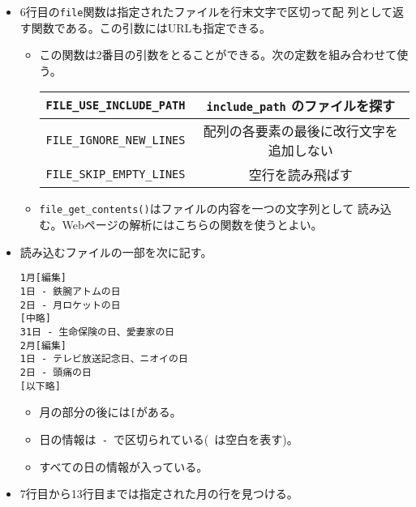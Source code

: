 \begin{Exec}
\begin{itemize}
\begin{itemize}
       きるように、スーパーグローバル\Verb+$_GET+内に値があれば
       (\Verb+isset()+)が\Verb+true+になれば、その値を、そうでなければコ
       マンドからの引数を設定している。
 \item スーパーグローバル\Verb+$argv+はの先頭は呼び出したファイル名であ
       り、その後に引数が順に入る\footnote{C言語の\texttt{main}関数は通
       常、\texttt{int main(int argc, char* argv[])}と宣言される。%
       \texttt{argc}は\texttt{argv}の配列の大きさを表し、渡された引数の
       リストが\texttt{argv[]}に入っている。このとき、\texttt{argv[0]}は実行
       したときのファイル名が入る。}。
\end{itemize}
 \item 6行目の\texttt{file}関数は指定されたファイルを行末文字で区切って配
       列として返す関数である。この引数にはURLも指定できる。
\begin{itemize}
 \item この関数は2番目の引数をとることができる。次の定数を組み合わせて使
       う。
\begin{center}
 \begin{tabular}{|c|c|}\hline
 \Verb+FILE_USE_INCLUDE_PATH+ & \Verb+include_path+ のファイルを探す\\\hline
 \Verb+FILE_IGNORE_NEW_LINES+ & 配列の各要素の最後に改行文字を追加しない
      \\ \hline
  \Verb+FILE_SKIP_EMPTY_LINES+&空行を読み飛ばす \\ \hline
 \end{tabular}
\end{center}
 \item \Verb+file_get_contents()+はファイルの内容を一つの文字列として
       読み込む。Webページの解析にはこちらの関数を使うとよい。
\end{itemize}
 \item 読み込むファイルの一部を次に記す。
\begin{Verbatim}
1月[編集]
1日 - 鉄腕アトムの日
2日 - 月ロケットの日
[中略]
31日 - 生命保険の日、愛妻家の日
2月[編集]
1日 - テレビ放送記念日、ニオイの日
2日 - 頭痛の日
[以下略]
\end{Verbatim}
\begin{itemize}
 \item 月の部分の後には\texttt{[}がある。
 \item 日の情報は\Verb*+ - +で区切られている(\Verb*+ +は空白を表す)。
 \item すべての日の情報が入っている。
\end{itemize}
 \item 7行目から13行目までは指定された月の行を見つける。

\end{itemize}
\end{Exec}
